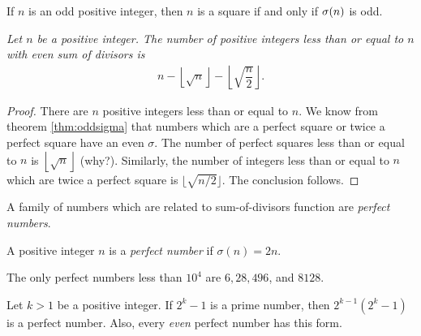 \documentclass[12pt]{subfile}
\begin{document}
	\begin{corollary}
		If $n$ is an odd positive integer, then $n$ is a square if and only if $\sigma (n)$ is odd.
	\end{corollary}
	
	\begin{proposition}\slshape
		Let $n$ be a positive integer. The number of positive integers less than or equal to $n$ with even sum of divisors is 
		\begin{align*}
			n-\left\lfloor\sqrt{n}\right\rfloor-\left\lfloor\sqrt{\dfrac{n}{2}}\right\rfloor.
		\end{align*}
	\end{proposition}
	
	\begin{proof}
		There are $n$ positive integers less than or equal to $n$. We know from theorem \eqref{thm:oddsigma} that numbers which are a perfect square or twice a perfect square have an even $\sigma$. The number of perfect squares less than or equal to $n$ is $\left\lfloor\sqrt{n}\right\rfloor$ (why?). Similarly, the number of integers less than or equal to $n$ which are twice a perfect square is $\lfloor\sqrt{n/2}\rfloor$. The conclusion follows.
	\end{proof}
	
	A family of numbers which are related to sum-of-divisors function are \textit{perfect numbers}.
	
	\begin{definition}
		A positive integer $n$ is a \textit{perfect number} if $\sigma(n)=2n$.
	\end{definition}
	
	\begin{example}
		The only perfect numbers less than $10^4$ are $6, 28, 496$, and $8128$.
	\end{example}
	
	\begin{theorem}
		Let $k>1$ be a positive integer. If $2^k-1$ is a prime number, then $2^{k-1}(2^k-1)$ is a perfect number. Also, every \textit{even} perfect number has this form.
	\end{theorem}
	
\end{document}
